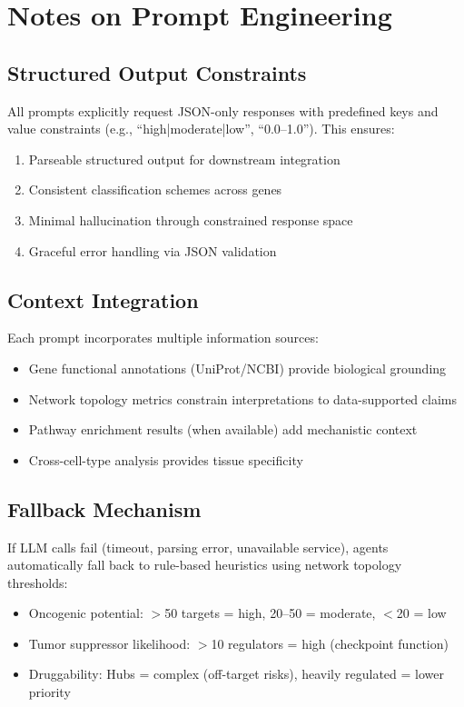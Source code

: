 \documentclass[11pt]{article}
\begin{document}
\section{Notes on Prompt Engineering}

\subsection{Structured Output Constraints}

All prompts explicitly request JSON-only responses with predefined keys and value constraints (e.g., ``high|moderate|low'', ``0.0--1.0''). This ensures:

\begin{enumerate}
\item Parseable structured output for downstream integration
\item Consistent classification schemes across genes
\item Minimal hallucination through constrained response space
\item Graceful error handling via JSON validation
\end{enumerate}

\subsection{Context Integration}

Each prompt incorporates multiple information sources:
\begin{itemize}
\item Gene functional annotations (UniProt/NCBI) provide biological grounding
\item Network topology metrics constrain interpretations to data-supported claims
\item Pathway enrichment results (when available) add mechanistic context
\item Cross-cell-type analysis provides tissue specificity
\end{itemize}

\subsection{Fallback Mechanism}

If LLM calls fail (timeout, parsing error, unavailable service), agents automatically fall back to rule-based heuristics using network topology thresholds:

\begin{itemize}
\item Oncogenic potential: $>$50 targets = high, 20--50 = moderate, $<$20 = low
\item Tumor suppressor likelihood: $>$10 regulators = high (checkpoint function)
\item Druggability: Hubs = complex (off-target risks), heavily regulated = lower priority
\end{itemize}
\end{document}

